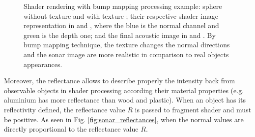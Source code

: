 \documentclass[final,5p,times]{elsarticle}
\begin{document}
\begin{figure}[!h]
{        \label{fig:bump_5}
    }
    \captionsetup{justification=centering}
    \caption{Shader rendering with bump mapping processing example: sphere without texture  and with texture ; their respective shader image representation in  and , where the blue is the normal channel and green is the depth one; and the final acoustic image in  and . By bump mapping technique, the texture changes the normal directions and the sonar image are more realistic in comparison to real objects appearances.}
    \label{fig:sonar_bump_mapping}
\end{figure}

Moreover, the reflectance allows to describe properly the intensity back from observable objects in shader processing according their material properties (e.g. aluminium has more reflectance than wood and plastic). When an object has its reflectivity defined, the reflectance value $R$ is passed to fragment shader and must be positive. As seen in Fig. \ref{fig:sonar_reflectances}, when the normal values are directly proportional to the reflectance value $R$.
\end{document}
